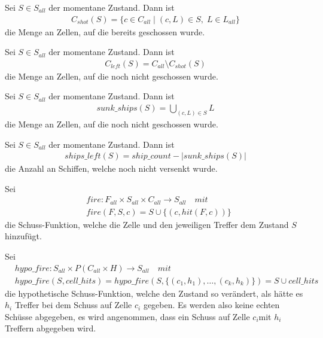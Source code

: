 \documentclass[a4paper,12pt]{llncs}
\numberwithin{equation}{section}
\begin{document}
\begin{definition}
Sei $S\in S_{all}$ der momentane Zustand.
Dann ist
\begin{align}
C_{shot}(S)=\{c \in C_{all} \mid (c,L) \in S, \; L \in L_{all}\}
\end{align}
 die Menge an Zellen, auf die bereits geschossen wurde.
\end{definition}

\begin{definition}
Sei $S\in S_{all}$ der momentane Zustand.
Dann ist 
\begin{align}
C_{left}(S)=C_{all} \setminus C_{shot}(S)
\end{align}
die Menge an Zellen, auf die noch nicht geschossen wurde.
\end{definition}

\begin{definition}
Sei $S\in S_{all}$ der momentane Zustand.
Dann ist 
\begin{align}
sunk\_ships(S)=\bigcup_{(c,L) \in S} L
\end{align}
die Menge an Zellen, auf die noch nicht geschossen wurde.
\end{definition}

\begin{definition}
Sei $S\in S_{all}$ der momentane Zustand.
Dann ist 
\begin{align}
ships\_left(S)=ship\_count - |sunk\_ships(S)|
\end{align}
die Anzahl an Schiffen, welche noch nicht versenkt wurde.
\end{definition}

\begin{definition}
Sei
\begin{align}
&fire:F_{all}\times S_{all}\times C_{all} \rightarrow S_{all} \quad mit \nonumber\\
&fire(F, S, c)=S \cup \{(c,hit(F, c))\}  \nonumber
\end{align}
die Schuss-Funktion, welche die Zelle und den jeweiligen Treffer dem Zustand $S$ hinzufügt.
\end{definition}

\begin{definition}
Sei
\begin{align}
&hypo\_fire:S_{all}\times P(C_{all}\times H) \rightarrow S_{all} \quad mit \nonumber\\
&hypo\_fire(S, cell\_hits)=hypo\_fire(S, \{(c_1,h_1), \dots, (c_k, h_k)\})=S \cup cell\_hits \nonumber
\end{align}
die hypothetische Schuss-Funktion, welche den Zustand so verändert, als hätte es $h_i$ Treffer bei dem Schuss auf Zelle $c_i$ gegeben. Es werden also keine echten Schüsse abgegeben, es wird angenommen, dass ein Schuss auf Zelle $c_i$mit $h_i$ Treffern abgegeben wird.
\end{definition}
\end{document}

